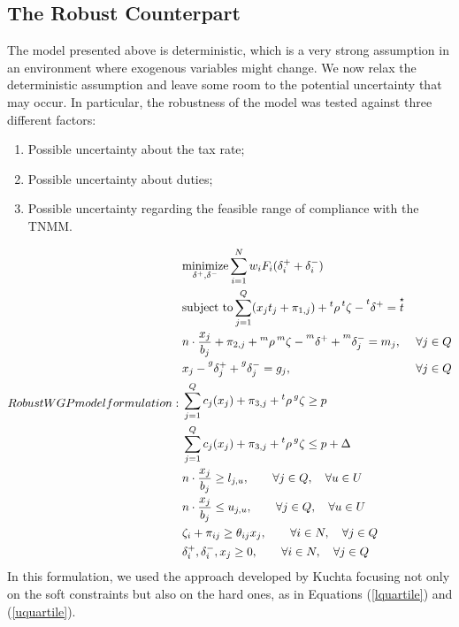 \documentclass[conference,final,]{IEEEtran}
\providecommand{\tightlist}{%
  \setlength{\itemsep}{0pt}\setlength{\parskip}{0pt}}
\begin{document}
\hypertarget{the-robust-counterpart}{%
\subsection{The Robust Counterpart}\label{the-robust-counterpart}}
The model presented above is deterministic, which is a very strong assumption in an environment where exogenous variables might change. We now relax the deterministic assumption and leave some room to the potential uncertainty that may occur. In particular, the robustness of the model was tested against three different factors:
\begin{enumerate}
\def\labelenumi{\arabic{enumi}.}
\tightlist
\item Possible uncertainty about the tax rate;
\item Possible uncertainty about duties;
\item Possible uncertainty regarding the feasible range of compliance with the TNMM.
\end{enumerate}
\begin{subequations}
Robust WGP model formulation:
\begin{align}
& \underset{\delta^+,\delta^-}{\text{minimize}} \sum^{N}_{i=1}w_iF_i(\delta^+_i + \delta^-_i)\\
& \text{subject to} \sum^{Q}_{j=1}(x_j t_j + \pi_{1,j})+ \prescript{t}{}{\rho} \prescript{t}{}{\zeta} - \prescript{t}{}{\delta^+}  =\overset{\star}{t} \\
& n\cdot \frac{x_j}{b_j}+\pi_{2,j}+ \prescript{m}{}{\rho} \prescript{m}{}{\zeta} - \prescript{m}{}{\delta^+} + \prescript{m}{}{\delta^-_j} = {m_j}, & \forall j \in Q \\
& {x_j} - \prescript{g}{}{\delta^+_j} + \prescript{g}{}{\delta^-_j}  = {g_j}, & \forall j \in Q \\
& \sum^{Q}_{j=1} c_j(x_j) + \pi_{3,j} + \prescript{t}{}{\rho} \prescript{g}{}{\zeta} \geq p \\
& \sum^{Q}_{j=1} c_j(x_j) + \pi_{3,j} + \prescript{t}{}{\rho} \prescript{g}{}{\zeta} \leq p + \Delta \\
& n\cdot \frac{x_j}{b_j} \geq {l_{j,u}}, \qquad  \forall j \in Q, \quad \forall u \in U \label{lquartile} \\
& n\cdot \frac{x_j}{b_j} \leq {u_{j,u}}, \qquad \forall j \in Q, \quad \forall u \in U \label{uquartile} \\
& \zeta_i + \pi_{ij} \geq \theta_{ij} x_{j},  \qquad \forall i \in N, \quad \forall j \in Q \\
& \delta^+_i,\delta^-_i,x_j\geq 0, \qquad \forall i \in N, \quad \forall j \in Q
\end{align}
\end{subequations}
In this formulation, we used the approach developed by Kuchta focusing
not only on the soft constraints but also on the hard ones, as in Equations (\ref{lquartile}) and (\ref{uquartile}).
\end{document}
